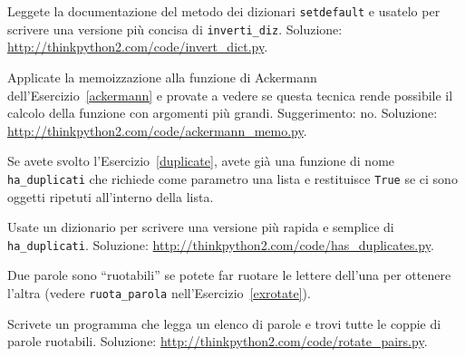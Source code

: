 \documentclass[10pt]{book}
\begin{document}
\vspace{0.2in}
\begin{exercise}
\label{setdefault}

Leggete la documentazione del metodo dei dizionari {\tt setdefault}
e usatelo per scrivere una versione più concisa di \verb"inverti_diz".
Soluzione: \url{http://thinkpython2.com/code/invert_dict.py}.

\end{exercise}

\vspace{0.2in}
\begin{exercise}

Applicate la memoizzazione alla funzione di Ackermann dell'Esercizio~\ref{ackermann} e provate a vedere se questa tecnica rende possibile il calcolo della funzione con argomenti più grandi. Suggerimento: no.
Soluzione: \url{http://thinkpython2.com/code/ackermann_memo.py}.

\end{exercise}

\vspace{0.2in}
\begin{exercise}

Se avete svolto l'Esercizio~\ref{duplicate}, avete già una funzione di nome \verb"ha_duplicati" che richiede come parametro una lista e restituisce {\tt True} se ci sono oggetti ripetuti all'interno della lista.

Usate un dizionario per scrivere una versione più rapida e semplice di
\verb"ha_duplicati". 
Soluzione: \url{http://thinkpython2.com/code/has_duplicates.py}.

\end{exercise}

\vspace{0.2in}
\begin{exercise}
\label{exrotatepairs}

Due parole sono ``ruotabili'' se potete far ruotare le lettere dell'una per ottenere l'altra (vedere \verb"ruota_parola" nell'Esercizio~\ref{exrotate}).

Scrivete un programma che legga un elenco di parole e trovi tutte le coppie di parole ruotabili. Soluzione: \url{http://thinkpython2.com/code/rotate_pairs.py}.

\end{exercise}
\end{document}
